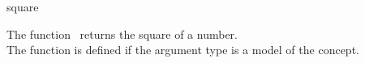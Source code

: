 \begin{ccRefFunction}{square}

\ccDefinition

The function \ccRefName\ returns the square of a number.\\
The function is defined if the argument type 
is a model of the  concept. 


{}

\ccSeeAlso

\\
\\

\end{ccRefFunction}
